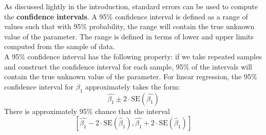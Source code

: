 \documentclass{article}
\begin{document}
As discussed lightly in the introduction, standard errors can be used to compute the \textbf{confidence intervals}. A 95\% confidence interval is defined as a range of values such that with 95\% probability, the range will contain the true unknown value of the parameter. The range is defined in terms of lower and upper limits computed from the sample of data. 
\\ A 95\% confidence interval has the following property: if we take repeated samples and construct the confidence interval for each sample, 95\% of the intervals will contain the true unknown value of the parameter. For linear regression, the 95\% confidence interval for $\beta_1$ approximately takes the form: \begin{equation*} \hat{\beta_1} \pm 2\cdot\text{SE}(\hat{\beta_1})\end{equation*}
There is approximately 95\% chance that the interval 
\begin{equation*} \left[\hat{\beta_1} - 2\cdot \text{SE}(\hat\beta_1), \hat{\beta_1} + 2\cdot \text{SE}(\hat\beta_1)  \right] \end{equation*}
\end{document}
